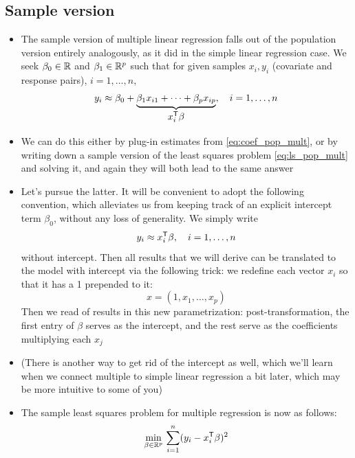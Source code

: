 \documentclass{article}
\begin{document}
\subsection{Sample version}

\begin{itemize}
\item The sample version of multiple linear regression falls out of the 
  population version entirely analogously, as it did in the simple linear
  regression case. We seek $\beta_0 \in \mathbb{R}$ and $\beta_1 \in \mathbb{R}^p$ 
  such that for given samples $x_i,y_i$ (covariate and response pairs), $i =
  1,\dots,n$,  
  \[
  y_i \approx \beta_0 + \underbrace{\beta_1 x_{i1} + \cdots + \beta_p 
    x_{ip}}_{\textstyle \begin{array}{c} x_i^{\mathsf{T}} \beta \end{array}}, \quad 
  i = 1,\dots,n 
  \]

\item We can do this either by plug-in estimates from \eqref{eq:coef_pop_mult},
  or by writing down a sample version of the least squares problem
  \eqref{eq:ls_pop_mult} and solving it, and again they will both lead to the 
  same answer

\item Let's pursue the latter. It will be convenient to adopt the following
  convention, which alleviates us from keeping track of an explicit intercept 
  term $\beta_0$, without any loss of generality. We simply write  
  \[
  y_i \approx x_i^{\mathsf{T}} \beta, \quad i = 1,\dots,n
  \]
  without intercept. Then all results that we will derive can be translated to
  the model with intercept via the following trick: we redefine each vector
  $x_i$ so that it has a 1 prepended to it:   
  \begin{equation}
  \label{eq:x_intercept}
  x = (1, x_1, \dots, x_p)
  \end{equation}
  Then we read of results in this new parametrization: post-transformation, the
  first entry of $\beta$ serves as the intercept, and the rest serve as the
  coefficients multiplying each $x_j$   

\item (There is another way to get rid of the intercept as well, which we'll
  learn when we connect multiple to simple linear regression a bit later, which
  may be more intuitive to some of you) 

\item The sample least squares problem for multiple regression is now as
  follows:  
  \begin{equation}
  \label{eq:ls_mult1}
  \min_{\beta \in \mathbb{R}^p} \, \sum_{i=1}^n (y_i - x_i^{\mathsf{T}} \beta)^2 
  \end{equation}


\end{itemize}
\end{document}
